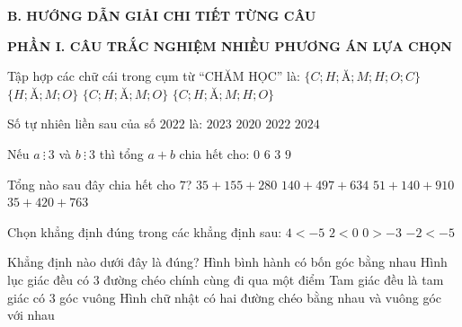 \documentclass[12pt,a4paper]{article}
\begin{document}
\noindent\textbf{\large B. HƯỚNG DẪN GIẢI CHI TIẾT TỪNG CÂU}
\vspace{2mm}

\noindent\textbf{\large PHẦN I. CÂU TRẮC NGHIỆM NHIỀU PHƯƠNG ÁN LỰA CHỌN}
\vspace{1mm}
\begin{ex}
Tập hợp các chữ cái trong cụm từ “CHĂM HỌC” là:
\choice
{$\{C; H; Ă; M; H; O; C\}$}
{$\{H; Ă; M; O\}$}
{\True $\{C; H; Ă; M; O\}$}
{$\{C; H; Ă; M; H; O\}$}
\end{ex}

\begin{ex}
Số tự nhiên liền sau của số $2022$ là:
\choice
{\True $2023$}
{$2020$}
{$2022$}
{$2024$}
\end{ex}

\begin{ex}
Nếu $a \ \vdots \ 3$ và $b \ \vdots \ 3$ thì tổng $a + b$ chia hết cho:
\choice
{$0$}
{$6$}
{\True $3$}
{$9$}
\end{ex}

\begin{ex}
Tổng nào sau đây chia hết cho $7$?
\choice
{$35 + 155 + 280$}
{$140 + 497 + 634$}
{$51 + 140 + 910$}
{\True $35 + 420 + 763$}
\end{ex}

\begin{ex}
Chọn khẳng định đúng trong các khẳng định sau:
\choice
{$4 < -5$}
{$2 < 0$}
{\True $0 > -3$}
{$-2 < -5$}
\end{ex}

\begin{ex}
Khẳng định nào dưới đây là đúng?
\choice
{Hình bình hành có bốn góc bằng nhau}
{\True Hình lục giác đều có 3 đường chéo chính cùng đi qua một điểm}
{Tam giác đều là tam giác có 3 góc vuông}
{Hình chữ nhật có hai đường chéo bằng nhau và vuông góc với nhau}
\end{ex}
\end{document}

